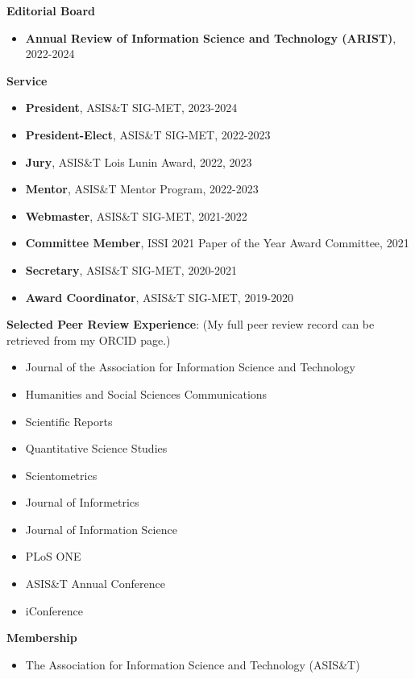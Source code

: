 \documentclass[margin, 10pt]{res} %
\begin{document}
\begin{resume}
\textbf{Editorial Board}
\begin{itemize}
\item \textbf{Annual Review of Information Science and Technology (ARIST)}, 2022-2024
\end{itemize}

\textbf{Service}
\begin{itemize}
\item \textbf{President}, ASIS\&T SIG-MET, 2023-2024
\item \textbf{President-Elect}, ASIS\&T SIG-MET, 2022-2023
\item \textbf{Jury}, ASIS\&T Lois Lunin Award, 2022, 2023
\item \textbf{Mentor}, ASIS\&T Mentor Program, 2022-2023
\item \textbf{Webmaster}, ASIS\&T SIG-MET, 2021-2022
\item \textbf{Committee Member}, ISSI 2021 Paper of the Year Award Committee, 2021
\item \textbf{Secretary}, ASIS\&T SIG-MET, 2020-2021
\item \textbf{Award Coordinator}, ASIS\&T SIG-MET, 2019-2020
\end{itemize}

\textbf{Selected Peer Review Experience}:  
(My full peer review record can be retrieved from my ORCID page.)

\begin{itemize}
\item Journal of the Association for Information Science and Technology
\item Humanities and Social Sciences Communications
\item Scientific Reports
\item Quantitative Science Studies
\item Scientometrics
\item Journal of Informetrics
\item Journal of Information Science
\item PLoS ONE
\item ASIS\&T Annual Conference
\item iConference 
\end{itemize}

\textbf{Membership}
\begin{itemize}
\item The Association for Information Science and Technology (ASIS\&T)
\end{itemize}


\end{resume}
\end{document}

